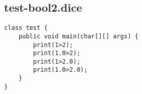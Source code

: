 \subsection{test-bool2.dice}
\begin{verbatim}
class test {
	public void main(char[][] args) {
		print(1>2);
		print(1.0>2);
		print(1>2.0);
		print(1.0>2.0);
	}
}
\end{verbatim}
